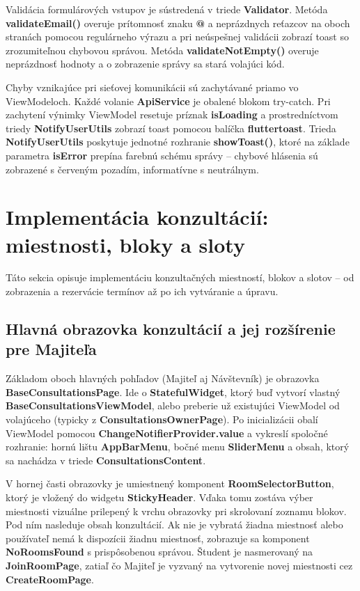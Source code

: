 Validácia formulárových vstupov je sústredená v triede \textbf{Validator}. Metóda \textbf{validateEmail()} overuje prítomnosť znaku \textbf{@} a neprázdnych reťazcov na oboch stranách pomocou regulárneho výrazu a pri neúspešnej validácii zobrazí toast so zrozumiteľnou chybovou správou. Metóda \textbf{validateNotEmpty()} overuje neprázdnosť hodnoty a o zobrazenie správy sa stará volajúci kód.

Chyby vznikajúce pri sieťovej komunikácii sú zachytávané priamo vo ViewModeloch. Každé volanie \textbf{ApiService} je obalené blokom try-catch. Pri zachytení výnimky ViewModel resetuje príznak \textbf{isLoading} a prostredníctvom triedy \textbf{NotifyUserUtils} zobrazí toast pomocou balíčka \textbf{fluttertoast}. Trieda \textbf{NotifyUserUtils} poskytuje jednotné rozhranie \textbf{showToast()}, ktoré na základe parametra \textbf{isError} prepína farebnú schému správy – chybové hlásenia sú zobrazené s červeným pozadím, informatívne s neutrálnym.

\section{Implementácia konzultácií: miestnosti, bloky a sloty}
\label{sec:impl-konzultacie}
Táto sekcia opisuje implementáciu konzultačných miestností, blokov a slotov – od zobrazenia a rezervácie termínov až po ich vytváranie a úpravu.

\subsection{Hlavná obrazovka konzultácií a jej rozšírenie pre Majiteľa
}
\label{subsec:base-consultations}

Základom oboch hlavných pohľadov (Majiteľ aj Návštevník) je obrazovka \textbf{BaseConsultationsPage}. Ide o \textbf{StatefulWidget}, ktorý buď vytvorí vlastný \textbf{BaseConsultationsViewModel}, alebo preberie už existujúci ViewModel od volajúceho (typicky z \textbf{ConsultationsOwnerPage}). Po inicializácii obalí ViewModel pomocou \textbf{ChangeNotifierProvider.value} a vykreslí spoločné rozhranie: hornú lištu \textbf{AppBarMenu}, bočné menu \textbf{SliderMenu} a obsah, ktorý sa nachádza v triede \textbf{ConsultationsContent}.

V hornej časti obrazovky je umiestnený komponent \textbf{RoomSelectorButton}, ktorý je vložený do widgetu \textbf{StickyHeader}. Vďaka tomu zostáva výber miestnosti vizuálne prilepený k vrchu obrazovky pri skrolovaní zoznamu blokov. Pod ním nasleduje obsah konzultácií. Ak nie je vybratá žiadna miestnosť alebo používateľ nemá k dispozícii žiadnu miestnosť, zobrazuje sa komponent \textbf{NoRoomsFound} s prispôsobenou správou. Študent je nasmerovaný na \textbf{JoinRoomPage}, zatiaľ čo Majiteľ je vyzvaný na vytvorenie novej miestnosti cez \textbf{CreateRoomPage}.

